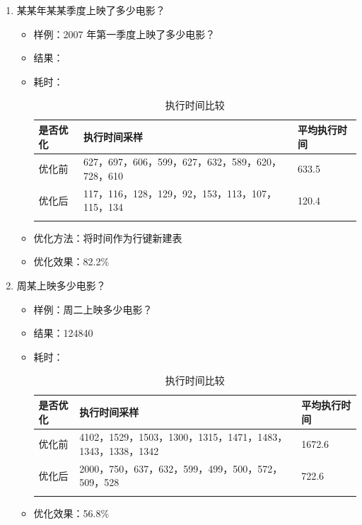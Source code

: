 \documentclass{ctexrep}
\begin{document}
\begin{enumerate}
\begin{itemize}
    	        \end{itemize}
    	    \item 某某年某某季度上映了多少电影？
    	        \begin{itemize}
    	            \item 样例：2007 年第一季度上映了多少电影？
    	            \item 结果：
    	            \item 耗时：
    	                \begin{longtable}{l|p{5cm}|l}
    	                    \hline
    	                    是否优化 & 执行时间采样 & 平均执行时间\\
    	                    \hline
    	                    \hline
    	                    优化前 & 627，697，606，599，627，632，589，620，728，610 & 633.5\\
    	                    优化后 & 117，116，128，129，92，153，113，107，115，134 & 120.4\\
    	                    \hline
    	                    \caption{执行时间比较}
    	                \end{longtable}
    	            \item 优化方法：将时间作为行键新建表
    	            \item 优化效果：82.2\%
    	        \end{itemize}
    	    \item 周某上映多少电影？
    	        \begin{itemize}
    	            \item 样例：周二上映多少电影？
    	            \item 结果：124840
    	            \item 耗时：
    	                \begin{longtable}{l|p{5cm}|l}
    	                    \hline
    	                    是否优化 & 执行时间采样 & 平均执行时间\\
    	                    \hline
    	                    \hline
    	                    优化前 & 4102，1529，1503，1300，1315，1471，1483，1343，1338，1342 & 1672.6\\
    	                    优化后 & 2000，750，637，632，599，499，500，572，509，528 & 722.6\\
    	                    \hline
    	                    \caption{执行时间比较}
    	                \end{longtable}
    	            \item 优化效果：56.8\%
    	        \end{itemize}
	    \end{enumerate}
\end{document}
